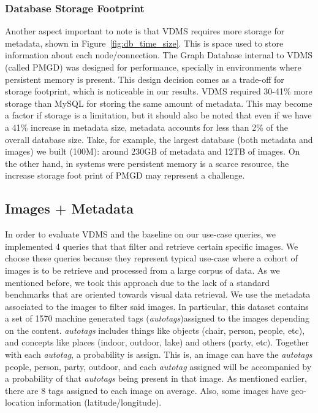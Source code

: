 \subsubsection{Database Storage Footprint}

Another aspect important to note is that
VDMS requires more storage for metadata, shown in Figure~\ref{fig:db_time_size}.
This is space used to store information about each node/connection.
The Graph Database internal to VDMS (called PMGD) was designed for performance,
specially in environments where persistent memory is present.
This design decision comes as a trade-off for storage footprint, which is
noticeable in our results.
VDMS required 30-41\% more storage than MySQL for storing the same amount
of metadata.
This may become a factor if storage is a limitation, but it should also be noted
that even if we have a 41\% increase in metadata size,
metadata accounts for less than 2\% of the overall database size.
Take, for example, the largest database (both metadata and images) we built
(100M): around 230GB of metadata and 12TB of images.
On the other hand, in systems were persistent memory is a scarce resource,
the increase storage foot print of PMGD may represent a challenge.


\subsection{Images + Metadata}
\label{images}

In order to evaluate VDMS and the baseline on our use-case queries,
we implemented 4 queries that that filter and retrieve certain specific images.
We choose these queries because they represent typical use-case where a
cohort of images is to be retrieve and processed from a large corpus of data.
As we mentioned before, we took this approach due to the lack of a standard
benchmarks that are oriented towards visual data retrieval.
We use the metadata associated to the images to filter said images.
In particular, this dataset contains a set of 1570 machine generated
tags (\textit{autotags})assigned to the images depending on the content.
\textit{autotags} includes things like objects (chair, person, people, etc), and
concepts like places (indoor, outdoor, lake) and others (party, etc).
Together with each \textit{autotag}, a probability is assign.
This is, an image can have the \textit{autotags} people, person, party,
outdoor, and each \textit{autotag} assigned will be accompanied by a
probability of that \textit{autotags} being present in that image.
As mentioned earlier, there are 8 tags assigned to each image on average.
Also, some images have geo-location information (latitude/longitude).


